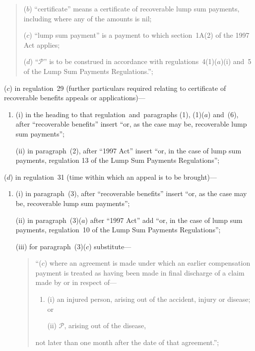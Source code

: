 \documentclass[12pt,a4paper]{article}
\begin{document}
\begin{enumerate}
\begin{quotation}
\begin{enumerate}

($b$) “certificate” means a certificate of recoverable lump sum payments, including where any of the amounts is nil;

($c$) “lump sum payment” is a payment to which section~1A(2) of the 1997 Act  applies;

($d$) “$\mathcal{P}$” is to be construed in accordance with regulations~4(1)($a$)(i)  and~5 of the Lump Sum Payments Regulations.”;
\end{enumerate}
\end{quotation}

($c$) in regulation~29 (further particulars required relating to certificate of recoverable benefits appeals or applications)—
\begin{enumerate}\item[]
(i) in the heading to that regulation~and~paragraphs (1), (1)($a$)  and~(6), after “recoverable benefits” insert “or, as the case may be, recoverable lump sum payments”;

(ii) in paragraph~(2), after “1997 Act” insert “or, in the case of lump sum payments, 
regulation 13  %
of the Lump Sum Payments Regulations”;
\end{enumerate}

($d$) in regulation~31 (time within which an appeal is to be brought)—
\begin{enumerate}\item[]
(i) in paragraph~(3), after “recoverable benefits” insert “or, as the case may be, recoverable lump sum payments”;

(ii) in paragraph~(3)($a$)  after “1997 Act” add “or, in the case of lump sum payments, regulation~10 of the Lump Sum Payments Regulations”;

(iii) for paragraph~(3)($c$)  substitute—
\begin{quotation}
“($c$) where an agreement is made under which an earlier compensation payment is treated as having been made in final discharge of a claim made by or in respect of—
\begin{enumerate}\item[]
(i) an injured person, arising out of the accident, injury or disease; or

(ii) $\mathcal{P}$, arising out of the disease,
\end{enumerate}
not later than one month after the date of that agreement.”;
\end{quotation}
\end{enumerate}


\end{enumerate}
\end{document}
